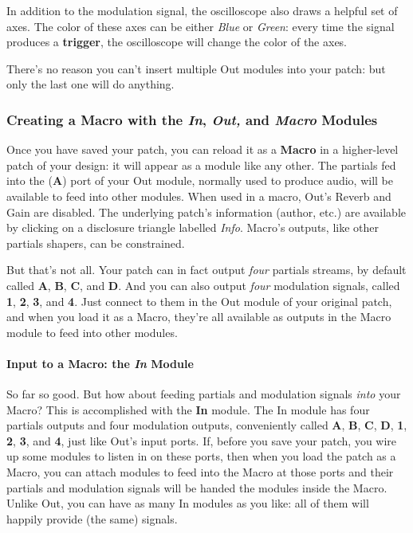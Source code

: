 \documentclass{article}
\begin{document}
In addition to the modulation signal, the oscilloscope also draws a helpful set of axes.  The color of these axes can be either {\it Blue} or {\it Green}: every time the signal produces a {\bf trigger}, the oscilloscope will change the color of the axes.

There's no reason you can't insert multiple Out modules into your patch: but only the last one will do anything.

\subsubsection{Creating a Macro with the \textit{In}, \textit{Out,} and \textit{Macro} Modules}
\label{creatingmacros}

Once you have saved your patch, you can reload it as a {\bf Macro} in a higher-level patch of your design: it will appear as a module like any other.  The partials fed into the ({\bf A}) port of your Out module, normally used to produce audio, will be available to feed into other modules. When used in a macro, Out's Reverb and Gain are disabled.  The underlying patch's information (author, etc.) are available by clicking on a disclosure triangle labelled {\it Info}.  Macro's outputs, like other partials shapers, can be constrained.

But that's not all.  Your patch can in fact output {\it four} partials streams, by default called {\bf A}, {\bf B}, {\bf C}, and {\bf D}.  And you can also output {\it four} modulation signals, called {\bf 1}, {\bf 2}, {\bf 3}, and {\bf 4}.  Just connect to them in the Out module of your original patch, and when you load it as a Macro, they're all available as outputs in the Macro module to feed into other modules. 

\paragraph{Input to a Macro: the \textit{In} Module}  So far so good.  But how about feeding partials and modulation signals {\it into} your Macro?  This is accomplished with the {\bf In} module.  The In module has four partials outputs and four modulation outputs, conveniently called {\bf A}, {\bf B}, {\bf C}, {\bf D}, {\bf 1}, {\bf 2}, {\bf 3}, and {\bf 4}, just like Out's input ports.  If, before you save your patch, you wire up some modules to listen in on these ports, then when you load the patch as a Macro, you can attach modules to feed into the Macro at those ports and their partials and modulation signals will be handed the modules inside the Macro.  Unlike Out, you can have as many In modules as you like: all of them will happily provide (the same) signals.
\end{document}
